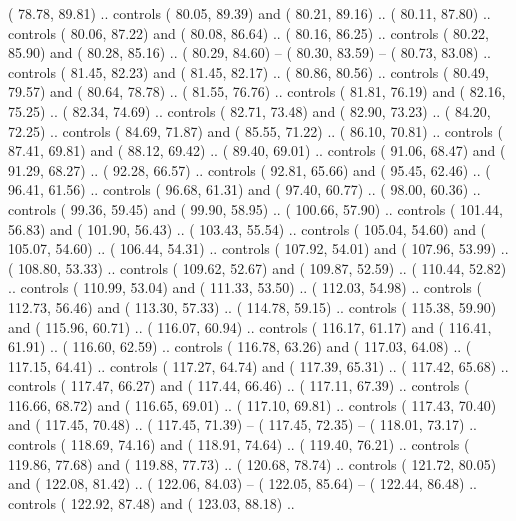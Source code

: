 {        (  78.78,  89.81) .. controls (  80.05,  89.39) and (  80.21,  89.16) ..
        (  80.11,  87.80) .. controls (  80.06,  87.22) and (  80.08,  86.64) ..
        (  80.16,  86.25) .. controls (  80.22,  85.90) and (  80.28,  85.16) ..
        (  80.29,  84.60) -- 
        (  80.30,  83.59) -- 
        (  80.73,  83.08) .. controls (  81.45,  82.23) and (  81.45,  82.17) ..
        (  80.86,  80.56) .. controls (  80.49,  79.57) and (  80.64,  78.78) ..
        (  81.55,  76.76) .. controls (  81.81,  76.19) and (  82.16,  75.25) ..
        (  82.34,  74.69) .. controls (  82.71,  73.48) and (  82.90,  73.23) ..
        (  84.20,  72.25) .. controls (  84.69,  71.87) and (  85.55,  71.22) ..
        (  86.10,  70.81) .. controls (  87.41,  69.81) and (  88.12,  69.42) ..
        (  89.40,  69.01) .. controls (  91.06,  68.47) and (  91.29,  68.27) ..
        (  92.28,  66.57) .. controls (  92.81,  65.66) and (  95.45,  62.46) ..
        (  96.41,  61.56) .. controls (  96.68,  61.31) and (  97.40,  60.77) ..
        (  98.00,  60.36) .. controls (  99.36,  59.45) and (  99.90,  58.95) ..
        ( 100.66,  57.90) .. controls ( 101.44,  56.83) and ( 101.90,  56.43) ..
        ( 103.43,  55.54) .. controls ( 105.04,  54.60) and ( 105.07,  54.60) ..
        ( 106.44,  54.31) .. controls ( 107.92,  54.01) and ( 107.96,  53.99) ..
        ( 108.80,  53.33) .. controls ( 109.62,  52.67) and ( 109.87,  52.59) ..
        ( 110.44,  52.82) .. controls ( 110.99,  53.04) and ( 111.33,  53.50) ..
        ( 112.03,  54.98) .. controls ( 112.73,  56.46) and ( 113.30,  57.33) ..
        ( 114.78,  59.15) .. controls ( 115.38,  59.90) and ( 115.96,  60.71) ..
        ( 116.07,  60.94) .. controls ( 116.17,  61.17) and ( 116.41,  61.91) ..
        ( 116.60,  62.59) .. controls ( 116.78,  63.26) and ( 117.03,  64.08) ..
        ( 117.15,  64.41) .. controls ( 117.27,  64.74) and ( 117.39,  65.31) ..
        ( 117.42,  65.68) .. controls ( 117.47,  66.27) and ( 117.44,  66.46) ..
        ( 117.11,  67.39) .. controls ( 116.66,  68.72) and ( 116.65,  69.01) ..
        ( 117.10,  69.81) .. controls ( 117.43,  70.40) and ( 117.45,  70.48) ..
        ( 117.45,  71.39) -- 
        ( 117.45,  72.35) -- 
        ( 118.01,  73.17) .. controls ( 118.69,  74.16) and ( 118.91,  74.64) ..
        ( 119.40,  76.21) .. controls ( 119.86,  77.68) and ( 119.88,  77.73) ..
        ( 120.68,  78.74) .. controls ( 121.72,  80.05) and ( 122.08,  81.42) ..
        ( 122.06,  84.03) -- 
        ( 122.05,  85.64) -- 
        ( 122.44,  86.48) .. controls ( 122.92,  87.48) and ( 123.03,  88.18) ..
}
